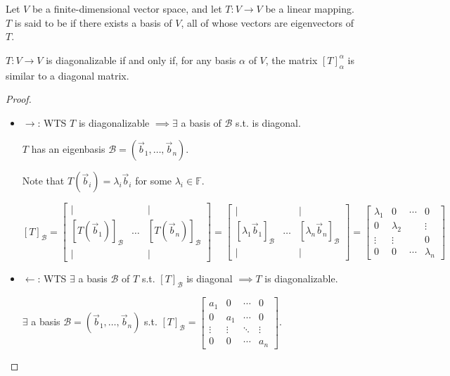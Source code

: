 \documentclass[11pt,fleqn]{book} %
\begin{document}
\setcounter{chapter}{4}
\begin{definition}[Diagonalizable]
    Let $V$ be a finite-dimensional vector space, and let $T: V \to V$ be a linear mapping. $T$ is said to be  if there exists a basis of $V$, all of whose vectors are eigenvectors of $T$.
\end{definition}

\setcounter{dummy}{1}
\begin{proposition}
    $T: V \to V$ is diagonalizable if and only if, for any basis $\alpha$ of $V$, the matrix $[T]_\alpha^\alpha$ is similar to a diagonal matrix.
\end{proposition}
\setcounter{chapter}{3}

\begin{proof}
{~~~}

    \begin{itemize}
        \item $\rightarrow$: WTS $T$ is diagonalizable $\implies \exists$ a basis  of $\mathcal{B}$ s.t.  is diagonal.

        $T$ has an eigenbasis $\mathcal{B} = (\vec{b}_1, \dots, \vec{b}_n)$.

        Note that $T(\vec{b}_i) = \lambda_i \vec{b}_i$ for some $\lambda_i \in \mathbb{F}$.

        $[T]_\mathcal{B} = \begin{bmatrix} | & &| \\ [T(\vec{b}_1)]_\mathcal{B} &\dots &[T(\vec{b}_n)]_\mathcal{B} \\ | & &| \end{bmatrix} = \begin{bmatrix} | & &| \\ [\lambda_1\vec{b}_1]_\mathcal{B} &\dots &[\lambda_n\vec{b}_n]_\mathcal{B} \\ | & &| \end{bmatrix} = \begin{bmatrix} \lambda_1 &0 &\cdots &0 \\ 0 &\lambda_2 & &\vdots \\ \vdots &\vdots & &0 \\ 0 &0 &\cdots &\lambda_n  \end{bmatrix}$

        \item $\leftarrow$: WTS $\exists$ a basis $\mathcal{B}$ of $T$ s.t. $[T]_\mathcal{B}$ is diagonal $\implies T$ is diagonalizable.

        $\exists$ a basis $\mathcal{B} = (\vec{b}_1, \dots, \vec{b}_n)$ s.t. $[T]_\mathcal{B} = \begin{bmatrix} a_1 &0 &\cdots &0 \\ 0 &a_1 &\cdots &0 \\ \vdots &\vdots &\ddots &\vdots \\ 0 &0 &\cdots &a_n \end{bmatrix}$.


\end{itemize}
\end{proof}
\end{document}
